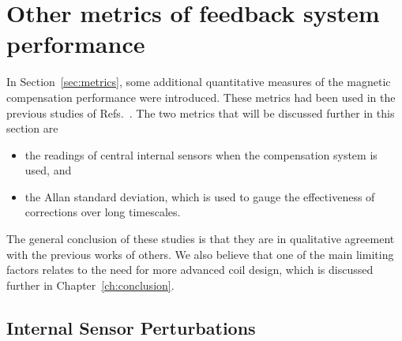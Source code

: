 
\section{Other metrics of feedback system performance}\label{sec:metrics_res}


In Section~\ref{sec:metrics}, some additional
quantitative measures of the magnetic compensation performance were introduced.  These
metrics had been used in the previous studies of
Refs.~\cite{bea,lins,rawlik}.  The two metrics that will be discussed further in this section are
\begin{itemize}
\item the readings of central internal sensors when the compensation system is used, and
\item the Allan standard deviation, which is used to gauge the effectiveness of corrections over long timescales.
\end{itemize}
The general conclusion of these studies is that they are in
qualitative agreement with the previous works of others.  We also
believe that one of the main limiting factors relates to the need for
more advanced coil design, which is discussed further in
Chapter~\ref{ch:conclusion}.


\subsection{Internal Sensor Perturbations}


